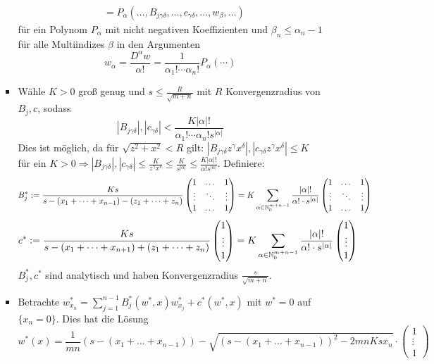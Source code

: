 \begin{enumerate}[(1)]
\begin{itemize}
\begin{itemize}
\begin{equation}
\begin{aligned}
						&= P_\alpha(\dots,B_{j\gamma\delta},\dots,c_{\gamma \delta},\dots,w_\beta,\dots)
					\end{aligned}
					\end{equation}
					für ein Polynom $P_\alpha$ mit nicht negativen Koeffizienten und $\beta_n \leq \alpha_n -1$ für alle Multiindizes $\beta$ in den Argumenten
					\[ w_\alpha = \frac{D^\alpha w}{\alpha!} = \frac{1}{\alpha_1! \cdots \alpha_n!} P_\alpha( \cdots ) \]
					\item Wähle $K > 0$ groß genug und $s \leq \frac{R}{\sqrt{m+n}}$ mit $R$ Konvergenzradius von $B_j,c$, sodass
					\[ | B_{j \gamma \delta}|,|c_{\gamma \delta}| < \frac{K |\alpha|!}{\alpha_1! \cdots \alpha_n! s^{|\alpha|}} \]
					Dies ist möglich, da für $\sqrt{z^2+x^2} < R$ gilt: $|B_{j \gamma \delta} z^\gamma x^\delta|,|c_{\gamma \delta} z^\gamma x^\delta| \leq K$ für ein $K > 0 \Rightarrow |B_{j \gamma \delta}|,|c_{\gamma \delta}| \leq \frac{K}{z^\gamma x^\delta} \leq \frac{K}{s^{|\alpha|}} \leq \frac{K |\alpha|!}{\alpha! s^{|\alpha|}}$.
					Definiere:
					\[B_j^* := \frac{Ks}{s-(x_1+\dots+x_{n-1})-(z_1 + \dots + z_n)} \begin{pmatrix} 1 & \dots & 1 \\ \vdots & \ddots & \vdots \\ 1 & \dots & 1	\end{pmatrix} = K \sum\limits_{\alpha \in \mathbb{N}_0^{m+n-1}} \frac{|\alpha|!}{\alpha! \cdot s^{|\alpha|}} \begin{pmatrix} 1 & \dots & 1 \\ \vdots & \ddots & \vdots \\ 1 & \dots & 1	\end{pmatrix} \]
					\[ c^* := \frac{Ks}{s-(x_1 + \dots + x_{n+1}) + (z_1 + \dots + z_n)} \begin{pmatrix}
					1 \\ \vdots \\ 1 \end{pmatrix} = K \sum\limits_{\alpha \in \mathbb{N}_0^{m+n-1}} \frac{|\alpha|!}{\alpha! \cdot s^{|\alpha|}} \begin{pmatrix} 1 \\ \vdots \\ 1 \end{pmatrix} \]
					 $B_j^*, c^*$ sind analytisch und haben Konvergenzradius $\frac{s}{\sqrt{m+n}}$.
					 \item Betrachte $w_{x_n}^* = \sum\limits_{j=1}^{n-1} B_j^*(w^*,x) w_{x_j}^* + c^*(w^*,x)$ mit $w^* = 0$ auf $\{x_n = 0\}$. Dies hat die Lösung
					 \[ w^*(x) = \frac{1}{mn} (s-(x_1 + \dots + x_{n-1})) - \sqrt{(s-(x_1+\dots+x_{n-1}))^2-2mnKsx_n} \cdot \begin{pmatrix}	1 \\ \vdots \\ 1 \end{pmatrix}\]

\end{itemize}
\end{itemize}
\end{enumerate}

